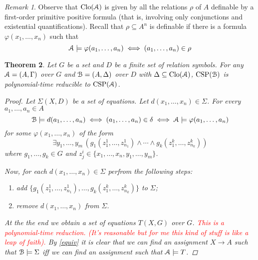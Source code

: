 \documentclass{amsart}
\theoremstyle{plain}
\newtheorem{theorem}{Theorem}[section]
\theoremstyle{definition}
\theoremstyle{remark}
\newtheorem{remark}[theorem]{Remark}
\def\phi{\varphi}
\def\E{\exists}
\DeclareMathOperator{\Clo}{Clo}
\DeclareMathOperator{\CSP}{CSP}
\begin{document}
\begin{remark}
    Observe that $\Clo(\EuScript{A})$ is given by all the relations $\rho$ of $A$ definable by a first-order primitive positive formula
    (that is, involving only conjunctions and existential quantifications). 
    Recall that $\rho \subseteq A^n$ is definable if there is a formula $\phi(x_1, \ldots, x_n)$ such that 
    \begin{equation*}
        \EuScript{A} \models \phi(a_1, \ldots, a_n) \iff (a_1, \ldots, a_n) \in \rho
    \end{equation*}
\end{remark}

\begin{theorem}
    Let $G$ be a set and $D$ be a finite set of relation symbols. 
    For any $\EuScript{A}=(A,\Gamma)$ over $G$ and $\EuScript{B}=(A,\Delta)$ over $D$ with $\Delta \subseteq \Clo(\EuScript{A})$, $\CSP(\EuScript{B})$ is polynomial-time reducible to $\CSP(\EuScript{A})$.
    \begin{proof}
        Let $\Sigma(X,D)$ be a set of equations. 
        Let $d(x_1, \ldots, x_n) \in \Sigma$. 
        For every $a_1, \ldots, a_n \in A$ 
        \begin{equation}
            \label{equiv}
            \EuScript{B} \models d(a_1, \ldots, a_n)  \iff (a_1, \ldots, a_n) \in \delta 
            \iff \EuScript{A} \models \phi(a_1, \ldots, a_n)
        \end{equation}
        for some $\phi(x_1, \ldots, x_n)$ of the form 
        \begin{equation*}
            \E y_1, \ldots, y_m \,( g_1(z^{1}_{1}, \ldots, z^{1}_{n_1}) \land \cdots \land g_k(z^{k}_{1}, \ldots, z^{k}_{n_k}))
        \end{equation*} 
        where $g_1, \ldots, g_k \in G$ and $z^{i}_{j} \in \{x_1, \ldots, x_n, y_1, \ldots, y_m\}$. 

        Now, for each $d(x_1, \ldots, x_n) \in \Sigma$ perfrom the following steps: 
        \begin{enumerate}
            \item add $\{g_1(z^{1}_{1}, \ldots, z^{1}_{n_1}), \ldots, g_k(z^{k}_{1}, \ldots, z^{k}_{n_k})\}$ to $\Sigma$; 
            \item remove $d(x_1, \ldots, x_n)$ from $\Sigma$. 
        \end{enumerate}
        At the the end we obtain a set of equations $T(X,G)$ over $G$. 
        \textcolor{red}{This is a polynomial-time reduction. (It's reasonable but for me this kind of stuff is like a leap of faith).} 
        By \eqref{equiv} it is clear that we can find an assignment $X \to A$ such that $\EuScript{B} \models \Sigma$ iff we can find an assignment such that $\EuScript{A} \models T$.
    \end{proof} 
\end{theorem}
\end{document}

